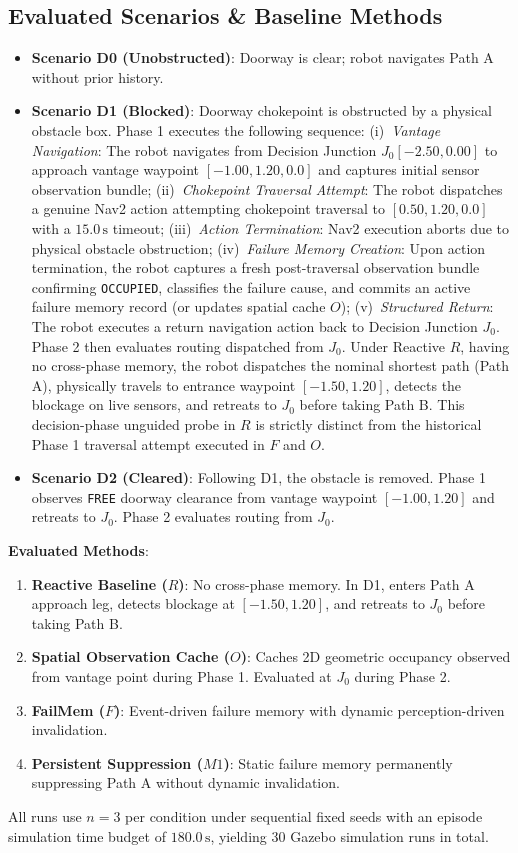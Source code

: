 \subsection{Evaluated Scenarios \& Baseline Methods}
\begin{itemize}
    \item \textbf{Scenario D0 (Unobstructed)}: Doorway is clear; robot navigates Path A without prior history.
    \item \textbf{Scenario D1 (Blocked)}: Doorway chokepoint is obstructed by a physical obstacle box. Phase 1 executes the following sequence:
    (i)~\emph{Vantage Navigation}: The robot navigates from Decision Junction $J_0 [-2.50, 0.00]$ to approach vantage waypoint $[-1.00, 1.20, 0.0]$ and captures initial sensor observation bundle;
    (ii)~\emph{Chokepoint Traversal Attempt}: The robot dispatches a genuine Nav2 action attempting chokepoint traversal to $[0.50, 1.20, 0.0]$ with a $15.0\,\text{s}$ timeout;
    (iii)~\emph{Action Termination}: Nav2 execution aborts due to physical obstacle obstruction;
    (iv)~\emph{Failure Memory Creation}: Upon action termination, the robot captures a fresh post-traversal observation bundle confirming \texttt{OCCUPIED}, classifies the failure cause, and commits an active failure memory record (or updates spatial cache $O$);
    (v)~\emph{Structured Return}: The robot executes a return navigation action back to Decision Junction $J_0$.
    Phase 2 then evaluates routing dispatched from $J_0$. Under Reactive $R$, having no cross-phase memory, the robot dispatches the nominal shortest path (Path A), physically travels to entrance waypoint $[-1.50, 1.20]$, detects the blockage on live sensors, and retreats to $J_0$ before taking Path B. This decision-phase unguided probe in $R$ is strictly distinct from the historical Phase 1 traversal attempt executed in $F$ and $O$.
    \item \textbf{Scenario D2 (Cleared)}: Following D1, the obstacle is removed. Phase 1 observes \texttt{FREE} doorway clearance from vantage waypoint $[-1.00, 1.20]$ and retreats to $J_0$. Phase 2 evaluates routing from $J_0$.
\end{itemize}

\textbf{Evaluated Methods}:
\begin{enumerate}
    \item \textbf{Reactive Baseline ($R$)}: No cross-phase memory. In D1, enters Path A approach leg, detects blockage at $[-1.50, 1.20]$, and retreats to $J_0$ before taking Path B.
    \item \textbf{Spatial Observation Cache ($O$)}: Caches 2D geometric occupancy observed from vantage point during Phase 1. Evaluated at $J_0$ during Phase 2.
    \item \textbf{FailMem ($F$)}: Event-driven failure memory with dynamic perception-driven invalidation.
    \item \textbf{Persistent Suppression ($M1$)}: Static failure memory permanently suppressing Path A without dynamic invalidation.
\end{enumerate}

All runs use $n=3$ per condition under sequential fixed seeds with an episode simulation time budget of $180.0\,\text{s}$, yielding 30 Gazebo simulation runs in total.
